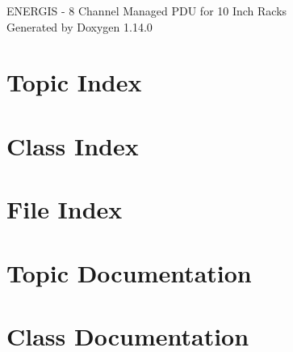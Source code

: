 \documentclass[twoside]{book}
\newcommand{\+}{\discretionary{\mbox{\scriptsize$\hookleftarrow$}}{}{}}
\newcommand{\clearemptydoublepage}{%
    \newpage{\pagestyle{empty}\cleardoublepage}%
  }
\begin{document}
  \raggedbottom
    \hypersetup{pageanchor=false,
                bookmarksnumbered=true,
                pdfencoding=unicode
               }
  \begin{titlepage}
  \vspace*{7cm}
  \begin{center}%
  {\Large ENERGIS -\/ 8 Channel Managed PDU for 10 Inch Racks}\\
  \vspace*{1cm}
  {\large Generated by Doxygen 1.14.0}\\
  \end{center}
  \end{titlepage}
  \clearemptydoublepage
  \tableofcontents
  \clearemptydoublepage
  \hypersetup{pageanchor=true}

\chapter{Topic Index}

\chapter{Class Index}

\chapter{File Index}

\chapter{Topic Documentation}







\chapter{Class Documentation}


































\end{document}

